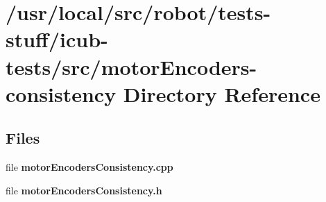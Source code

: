 \section{/usr/local/src/robot/tests-\/stuff/icub-\/tests/src/motor\-Encoders-\/consistency Directory Reference}
\label{dir_17d4ce36b7900267f65be626f70cb756}
\subsection*{Files}
\begin{DoxyCompactItemize}
\item 
file {\bfseries motor\-Encoders\-Consistency.\-cpp}
\item 
file {\bfseries motor\-Encoders\-Consistency.\-h}
\end{DoxyCompactItemize}
